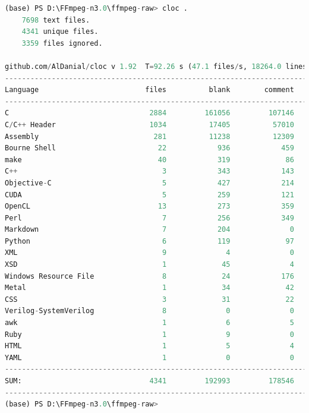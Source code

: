 \documentclass[10pt,UTF8]{ctexart}
\begin{document}
\begin{lstlisting}[language={python}]
(base) PS D:\FFmpeg-n3.0\ffmpeg-raw> cloc .
    7698 text files.
    4341 unique files.
    3359 files ignored.

github.com/AlDanial/cloc v 1.92  T=92.26 s (47.1 files/s, 18264.0 lines/s)
-----------------------------------------------------------------------------------
Language                         files          blank        comment           code
-----------------------------------------------------------------------------------
C                                 2884         161056         107146        1068012
C/C++ Header                      1034          17405          57010         121608
Assembly                           281          11238          12309         100291
Bourne Shell                        22            936            459           8150
make                                40            319             86           4370
C++                                  3            343            143           2206
Objective-C                          5            427            214           2092
CUDA                                 5            259            121           1399
OpenCL                              13            273            359           1349
Perl                                 7            256            349           1050
Markdown                             7            204              0            868
Python                               6            119             97            577
XML                                  9              4              0            432
XSD                                  1             45              4            337
Windows Resource File                8             24            176            240
Metal                                1             34             42            202
CSS                                  3             31             22            140
Verilog-SystemVerilog                8              0              0             56
awk                                  1              6              5             53
Ruby                                 1              9              0             52
HTML                                 1              5              4             44
YAML                                 1              0              0             30
-----------------------------------------------------------------------------------
SUM:                              4341         192993         178546        1313558
-----------------------------------------------------------------------------------
(base) PS D:\FFmpeg-n3.0\ffmpeg-raw>
\end{lstlisting}
\end{document}
